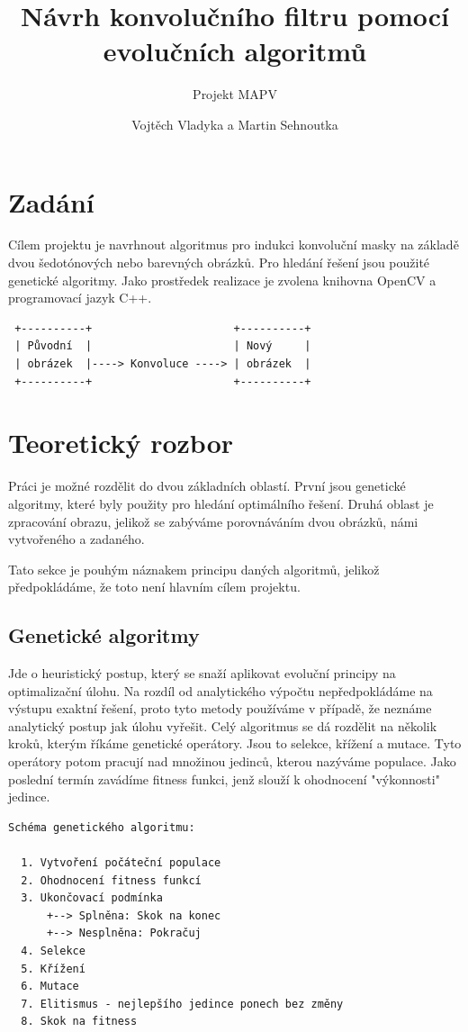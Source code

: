 \documentclass[a4paper,11pt,titlepage]{scrartcl}
\title{Návrh konvolučního filtru pomocí evolučních algoritmů}
\subtitle{Projekt MAPV}
\author{Vojtěch Vladyka a Martin Sehnoutka}
\begin{document}
\maketitle
\tableofcontents

\newpage

\section{Zadání}
Cílem projektu je navrhnout algoritmus pro indukci konvoluční masky na základě dvou šedotónových nebo barevných obrázků. Pro hledání řešení jsou použité genetické algoritmy. Jako prostředek realizace je zvolena knihovna OpenCV a programovací jazyk C++.

\begin{verbatim}
 +----------+                      +----------+
 | Původní  |                      | Nový     |
 | obrázek  |----> Konvoluce ----> | obrázek  |
 +----------+                      +----------+
\end{verbatim}

\section{Teoretický rozbor}

Práci je možné rozdělit do dvou základních oblastí. První jsou genetické algoritmy, které byly použity pro hledání optimálního řešení. Druhá oblast je zpracování obrazu, jelikož se zabýváme porovnáváním dvou obrázků, námi vytvořeného a zadaného.

Tato sekce je pouhým náznakem principu daných algoritmů, jelikož předpokládáme, že toto není hlavním cílem projektu.

\subsection{Genetické algoritmy}

Jde o heuristický postup, který se snaží aplikovat evoluční principy na optimalizační úlohu. Na rozdíl od analytického výpočtu nepředpokládáme na výstupu exaktní řešení, proto tyto metody používáme v případě, že neznáme analytický postup jak úlohu vyřešit. Celý algoritmus se dá rozdělit na několik kroků, kterým říkáme genetické operátory. Jsou to selekce, křížení a mutace. Tyto operátory potom pracují nad množinou jedinců, kterou nazýváme populace. Jako poslední termín zavádíme fitness funkci, jenž slouží k ohodnocení "výkonnosti" jedince.

\begin{verbatim}
Schéma genetického algoritmu:

  1. Vytvoření počáteční populace
  2. Ohodnocení fitness funkcí
  3. Ukončovací podmínka
      +--> Splněna: Skok na konec 
      +--> Nesplněna: Pokračuj
  4. Selekce
  5. Křížení
  6. Mutace
  7. Elitismus - nejlepšího jedince ponech bez změny
  8. Skok na fitness
\end{verbatim}
\end{document}
